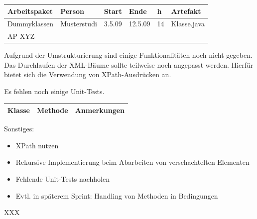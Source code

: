 \begin{longtable}{|p{4cm}|l|l|l|l|l|}
        \hline
        Arbeitspaket & Person & Start & Ende & h & Artefakt\\
        \hline
        Dummyklassen & Musterstudi & 3.5.09 & 12.5.09 & 14 & Klasse.java\\ \hline
        AP XYZ &  &  &  & & \\ \hline
\end{longtable}     
\nsecend

Aufgrund der Umstrukturierung sind einige Funktionalitäten noch nicht gegeben. Das Durchlaufen der XML-Bäume sollte teilweise noch angepasst werden. Hierfür bietet sich die Verwendung von XPath-Ausdrücken an.
\nsecend%

Es fehlen noch einige Unit-Tests.
\nsecend%

\begin{table}[H]

\begin{tabularx}{\textwidth}{ |l|l|X| }
\hline
\textbf{Klasse} & \textbf{Methode} & \textbf{Anmerkungen}\\
 \hline
\hline
\end{tabularx}
\end{table}

Sonstiges:
\begin{itemize}
\item XPath nutzen
\item Rekursive Implementierung beim Abarbeiten von verschachtelten Elementen
\item Fehlende Unit-Tests nachholen
\item Evtl. in späterem Sprint: Handling von Methoden in Bedingungen
\end{itemize}
\nsecend%


\nsecend%

XXX
\nsecend%


\nsecend%